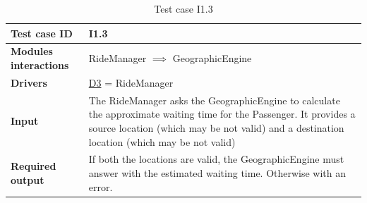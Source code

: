 \begin{table}[H]
\begin{tabular}{ l | p{} }
\textbf{Test case ID} & I1.3 \\ \hline
\textbf{Modules interactions} & RideManager $\implies$ GeographicEngine \\ \hline
\textbf{Drivers} &  \hyperref[D3]{D3} = RideManager \\ \hline
\textbf{Input} & The RideManager asks the GeographicEngine to calculate the approximate waiting time for the Passenger. It provides a source location (which may be not valid) and a destination location (which may be not valid) \\ \hline
\textbf{Required output} & If both the locations are valid, the GeographicEngine must answer with the estimated waiting time. Otherwise with an error.
\end{tabular}
\caption{Test case I1.3}
\end{table}